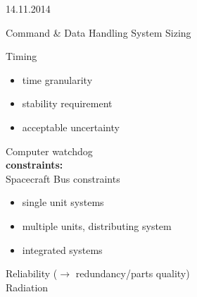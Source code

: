 \begin{chapter}{14.11.2014}
\begin{section}{Command \& Data Handling System Sizing}
\begin{itemize}
  \end{itemize}
  Timing
  \begin{itemize}
   \item time granularity
   \item stability requirement
   \item acceptable uncertainty
  \end{itemize}
  Computer watchdog\\
  \textbf{constraints:}\\
  Spacecraft Bus constraints
  \begin{itemize}
   \item single unit systems
   \item multiple units, distributing system
   \item integrated systems
  \end{itemize}
  Reliability ($\rightarrow$ redundancy/parts quality)\\
  Radiation






 \end{section}

\end{chapter}
